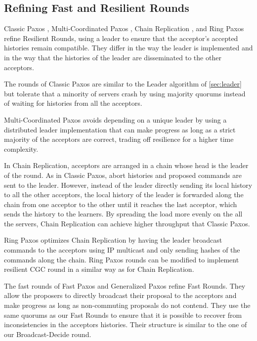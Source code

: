 \subsection{Refining Fast and Resilient Rounds}

Classic Paxos \cite{lamport2001paxos}, Multi-Coordinated Paxos \cite{CamargosSchmidtPedone07MulticoordinatedPaxos}, Chain Replication \cite{RenesseSchneider04ChainReplicationSupportingHighThroughputAvailability}, and Ring Paxos \cite{MarandiETAL10RingPaxosHighthroughputAtomicBroadcastProtocol} refine Resilient Rounds, using a leader to ensure that the acceptor's accepted histories remain compatible. They differ in the way the leader is
implemented and in the way that the histories of the leader are disseminated to
the other acceptors.

The rounds of Classic Paxos are similar to the Leader algorithm of \cref{sec:leader} but
tolerate that a minority of servers crash by using majority quorums instead of
waiting for histories from all the acceptors.

Multi-Coordinated Paxos avoids depending on a unique leader by using a
distributed leader implementation that can make progress as long as a strict
majority of the acceptors are correct, trading off resilience for a higher time
complexity.

In Chain Replication, acceptors are arranged in a chain whose head is
the leader of the round. As in Classic Paxos, abort histories and
proposed commands are sent to the leader. However, instead of the
leader directly sending its local history to all the other acceptors,
the local history of the leader is
forwarded along the chain from one acceptor to the other until it
reaches the last acceptor, which sends the history to the learners. 
By spreading the load more evenly on the all the servers, Chain Replication
can achieve higher throughput that Classic Paxos.

Ring Paxos optimizes Chain Replication by having the leader broadcast
commands to the acceptors using IP multicast and only sending hashes
of the commands along the chain. Ring Paxos rounds can be modified to implement
resilient CGC round in a similar way as for Chain Replication.

The fast rounds of Fast Paxos \cite{Lamport06FastPaxos} and Generalized Paxos \cite{Lamport05GeneralizeConsensus} refine Fast Rounds.
They allow the proposers to directly broadcast their proposal to the 
acceptors and make progress as long as non-commuting proposals do not contend.
They use the same quorums as our Fast Rounds to ensure that it is possible to recover from inconsistencies 
in the acceptors histories.
Their structure is similar to the one of our Broadcast-Decide round.

